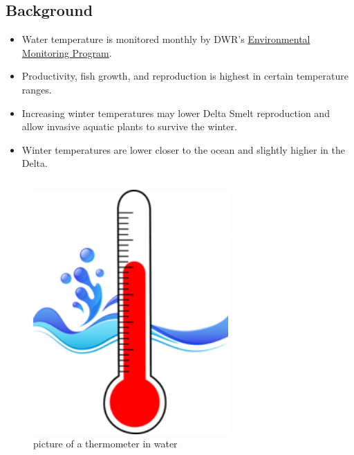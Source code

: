 \documentclass[
]{book}
\providecommand{\tightlist}{%
  \setlength{\itemsep}{0pt}\setlength{\parskip}{0pt}}
\begin{document}
\begin{columns-nocenter}

\begin{column}

\hypertarget{background-1}{%
\subsection{Background}\label{background-1}}

\begin{itemize}
\tightlist
\item
  Water temperature is monitored monthly by DWR's \href{https://emp.baydeltalive.com/wiki/12297}{Environmental Monitoring Program}.
\item
  Productivity, fish growth, and reproduction is highest in certain temperature ranges.
\item
  Increasing winter temperatures may lower Delta Smelt reproduction and allow invasive aquatic plants to survive the winter.
\item
  Winter temperatures are lower closer to the ocean and slightly higher in the Delta.
\end{itemize}

\end{column}

\begin{column}

\begin{figure}

{\centering \includegraphics[width=2.94in]{figures/thermometer} 

}

\caption{picture of a thermometer in water}\label{fig:unnamed-chunk-150}
\end{figure}

\end{column}

\end{columns-nocenter}
\end{document}
